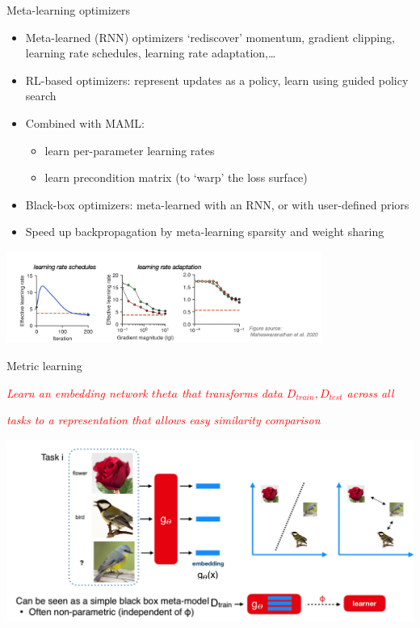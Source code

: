 \documentclass[aspectratio=169,t,handout,xcolor={usenames,dvipsnames}]{beamer}
\begin{document}
\begin{frame}{Meta-learning optimizers}
    \begin{itemize}
        \item Meta-learned (RNN) optimizers ‘rediscover’ momentum, gradient clipping, learning rate schedules, learning rate adaptation,… \\
        \item RL-based optimizers: represent updates as a policy, learn using guided policy search 
        \item Combined with MAML: 
        \begin{itemize}
            \item learn per-parameter learning rates
            \item learn precondition matrix (to `warp' the loss surface)
        \end{itemize}
        \item Black-box optimizers: meta-learned with an RNN, or with user-defined priors
        \item Speed up backpropagation by meta-learning sparsity and weight sharing 
    \end{itemize}
    \centering\includegraphics[height=3cm]{image/Jietu20220329-012318.jpg}
\end{frame}
\begin{frame}{Metric learning}

    \centerline{\textit{\textcolor{red}{Learn an embedding network $theta$ that transforms data ${D_{train},D_{test}}$ across all}}}
    \centerline{\textit{\textcolor{red}{tasks to a representation that allows easy similarity comparison}}}
    \centering\includegraphics[height=6cm]{image/Jietu20220329-012823.jpg}
\end{frame}
\end{document}
